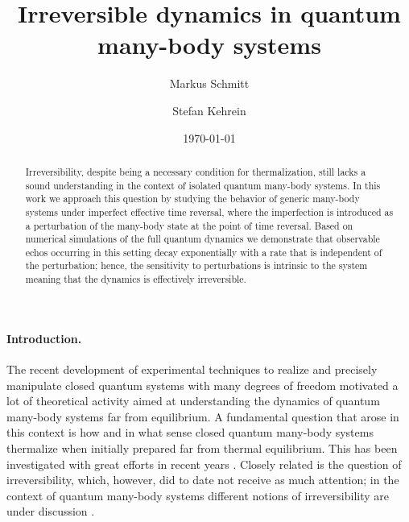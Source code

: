 \documentclass[%
 reprint,
unsortedaddress,
 amsmath,amssymb,
 prl,
]{revtex4-1}
\begin{document}
\title{Irreversible dynamics in quantum many-body systems}


\author{Markus Schmitt}
\author{Stefan Kehrein}
\date{\today}

\begin{abstract}
Irreversibility, despite being a necessary condition for thermalization, still lacks a sound understanding in the context of isolated quantum many-body systems. In this work we approach this question by studying the behavior of generic many-body systems under imperfect effective time reversal, where the imperfection is introduced as a perturbation of the many-body state at the point of time reversal. Based on numerical simulations of the full quantum dynamics we demonstrate that observable echos occurring in this setting decay exponentially with a rate that is independent of the perturbation; hence, the sensitivity to perturbations is intrinsic to the system meaning that the dynamics is effectively irreversible.
\end{abstract}

\maketitle

\paragraph{Introduction.}
The recent development of experimental techniques to realize and precisely manipulate closed
quantum systems with many degrees of freedom 
\cite{Greiner2002, Kinoshita2006,Choi2016,Jurcevic2017,Zhang2017,Bernien2017,Guardado-Sanchez2018} 
motivated a lot of theoretical activity aimed
at understanding the dynamics of quantum many-body systems far from equilibrium.
A fundamental question that arose in this context is how and in what sense closed 
quantum many-body systems thermalize when initially prepared far from
thermal equilibrium. This has been investigated with great efforts in recent years 
\cite{Eisert2015,dAlessio2016}.
Closely related is the question of irreversibility, which, however, did to date not receive as much attention; in the context of quantum many-body systems different notions of irreversibility are under discussion \cite{Levstein1998,Usaj1998,Zangara2015,Schmitt2016,Swingle2018}.
\end{document}

